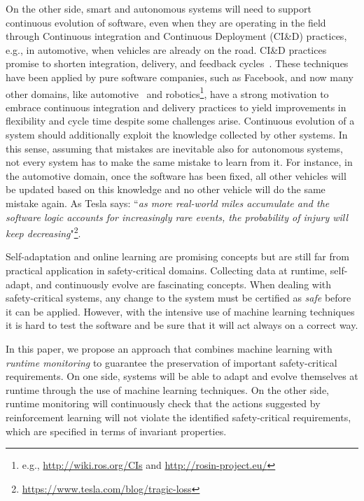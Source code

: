 \documentclass[sigconf,review, anonymous]{acmart}
\begin{document}
On the other side, smart and autonomous systems will need to support continuous evolution of software, even when they are operating in the field through Continuous integration and Continuous Deployment (CI\&D) practices, e.g., in automotive, when
vehicles are already on the road. 
CI\&D practices promise to shorten integration, delivery,
and feedback cycles~\cite{Stahl2014}.
These techniques have been applied by pure software companies, such as Facebook, and now many other domains, like automotive~\cite{Knauss2016} and robotics\footnote{e.g., \url{http://wiki.ros.org/CIs} and \url{http://rosin-project.eu/}}, have a strong motivation
to embrace continuous integration and delivery practices to yield improvements in flexibility
and cycle time despite some challenges arise.
Continuous evolution of a system should additionally exploit %
the knowledge collected by other systems. In this sense, assuming that mistakes are inevitable also for autonomous systems, not every system has to make the same mistake to learn from it. For instance, in the automotive domain, once the software has been fixed, all other vehicles will be updated based on this knowledge and no other vehicle will do the same mistake again. As Tesla says: ``\emph{as more real-world miles accumulate and the software logic accounts for increasingly rare events, the probability of injury will keep decreasing}"\footnote{\url{https://www.tesla.com/blog/tragic-loss}}.







Self-adaptation and online learning are promising concepts but are still far from practical application in safety-critical domains. Collecting data at runtime, self-adapt, and continuously evolve are fascinating concepts. When dealing with safety-critical systems, any change to the system must be certified as \emph{safe} before it can be applied. %
However, with the intensive use of machine learning techniques it is hard to test the software and be sure that it will act always on a correct way. 

In this paper, we propose an approach that combines machine learning with \emph{runtime monitoring} to guarantee the preservation of important safety-critical requirements. 
On one side, systems will be able to adapt and evolve themselves at runtime through the use of machine learning techniques. On the other side, runtime monitoring will continuously check that the actions suggested by reinforcement learning will not violate 
the identified safety-critical requirements, which are specified in terms of invariant properties.
\end{document}
